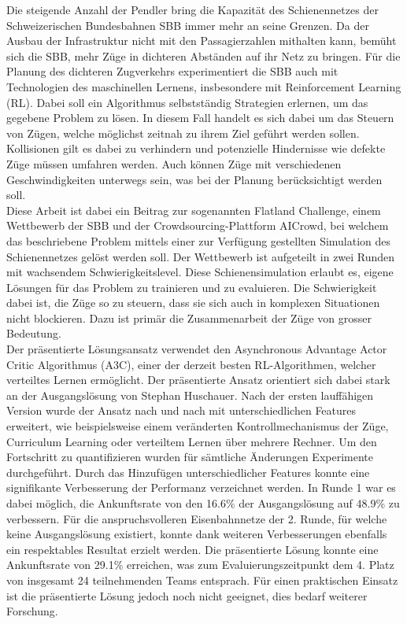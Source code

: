Die steigende Anzahl der Pendler bring die Kapazität des Schienennetzes der Schweizerischen Bundesbahnen SBB immer mehr an seine Grenzen. Da der Ausbau der Infrastruktur nicht mit den Passagierzahlen mithalten kann, bemüht sich die SBB, mehr Züge in dichteren Abständen auf ihr Netz zu bringen.
Für die Planung des dichteren Zugverkehrs experimentiert die SBB auch mit Technologien des maschinellen Lernens, insbesondere mit Reinforcement Learning (RL). Dabei soll ein Algorithmus selbstständig Strategien erlernen, um das gegebene Problem zu lösen. In diesem Fall handelt es sich dabei um das Steuern von Zügen, welche möglichst zeitnah zu ihrem Ziel geführt werden sollen. Kollisionen gilt es dabei zu verhindern und potenzielle Hindernisse wie defekte Züge müssen umfahren werden. Auch können Züge mit verschiedenen Geschwindigkeiten unterwegs sein, was bei der Planung berücksichtigt werden soll.\\
Diese Arbeit ist dabei ein Beitrag zur sogenannten Flatland Challenge, einem Wettbewerb der SBB und der Crowdsourcing-Plattform AICrowd, bei welchem das beschriebene Problem mittels einer zur Verfügung gestellten Simulation des Schienennetzes gelöst werden soll. Der Wettbewerb ist aufgeteilt in zwei Runden mit wachsendem Schwierigkeitslevel.
Diese Schienensimulation erlaubt es, eigene Lösungen für das Problem zu trainieren und zu evaluieren. Die Schwierigkeit dabei ist, die Züge so zu steuern, dass sie sich auch in komplexen Situationen nicht blockieren. Dazu ist primär die Zusammenarbeit der Züge von grosser Bedeutung.\\
Der präsentierte Lösungsansatz verwendet den Asynchronous Advantage Actor Critic Algorithmus (A3C), einer der derzeit besten RL-Algorithmen, welcher verteiltes Lernen ermöglicht. Der präsentierte Ansatz orientiert sich dabei stark an der Ausgangslösung von Stephan Huschauer.
Nach der ersten lauffähigen Version wurde der Ansatz nach und nach mit unterschiedlichen Features erweitert, wie beispielsweise einem veränderten Kontrollmechanismus der Züge, Curriculum Learning oder verteiltem Lernen über mehrere Rechner.
Um den Fortschritt zu quantifizieren wurden für sämtliche Änderungen Experimente durchgeführt. Durch das Hinzufügen unterschiedlicher Features konnte eine signifikante Verbesserung der Performanz verzeichnet werden. In Runde 1 war es dabei möglich, die Ankunftsrate von den 16.6\% der Ausgangslösung auf 48.9\% zu verbessern.
Für die anspruchsvolleren Eisenbahnnetze der 2. Runde, für welche keine Ausgangslösung existiert, konnte dank weiteren Verbesserungen ebenfalls ein respektables Resultat erzielt werden. Die präsentierte Lösung konnte eine Ankunftsrate von 29.1\% erreichen, was zum Evaluierungszeitpunkt dem 4. Platz von insgesamt 24 teilnehmenden Teams entsprach. Für einen praktischen Einsatz ist die präsentierte Lösung jedoch noch nicht geeignet, dies bedarf weiterer Forschung.
\newpage
\thispagestyle{empty}
